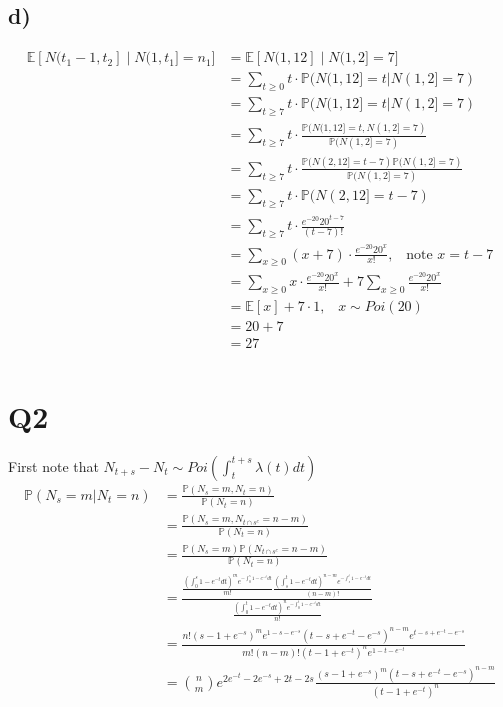 \documentclass{article}
\begin{document}
\subsection*{d)}
\begin{align*}
\mathbb{E}[N(t_1-1,t_2]\;|\;N(1,t_1]=n_1]&=\mathbb{E}[N(1,12]\;|\;N(1,2]=7]\\
&=\sum_{t\geq0}t\cdot\mathbb{P}(N(1,12]=t|N(1,2]=7)\\
&=\sum_{t\geq7}t\cdot\mathbb{P}(N(1,12]=t|N(1,2]=7)\\
&=\sum_{t\geq7}t\cdot\frac{\mathbb{P}(N(1,12]=t,N(1,2]=7)}{\mathbb{P}(N(1,2]=7)}\\
&=\sum_{t\geq7}t\cdot\frac{\mathbb{P}(N(2,12]=t-7)\mathbb{P}(N(1,2]=7)}{\mathbb{P}(N(1,2]=7)}\\
&=\sum_{t\geq7}t\cdot\mathbb{P}(N(2,12]=t-7)\\
&=\sum_{t\geq7}t\cdot\frac{e^{-20}20^{t-7}}{(t-7)!}\\
&=\sum_{x\geq0}(x+7)\cdot\frac{e^{-20}20^{x}}{x!},\;\;\;\text{note }x=t-7\\
&=\sum_{x\geq0}x\cdot\frac{e^{-20}20^{x}}{x!}+7\sum_{x\geq0}\frac{e^{-20}20^{x}}{x!}\\
&=\mathbb{E}[x]+7\cdot1,\;\;\;x\sim Poi(20)\\
&=20+7\\
&=27\\
\end{align*}
\section*{Q2}
First note that $N_{t+s}-N_{t}\sim Poi\left(\int_{t}^{t+s}\lambda(t)dt\right)$
\begin{align*}
\mathbb{P}(N_{s}=m|N_{t}=n)&=\frac{\mathbb{P}(N_{s}=m,N_{t}=n)}{\mathbb{P}(N_{t}=n)}\\
&=\frac{\mathbb{P}(N_{s}=m,N_{t\cap s^{c}}=n-m)}{\mathbb{P}(N_{t}=n)}\\
&=\frac{\mathbb{P}(N_{s}=m)\mathbb{P}(N_{t\cap s^{c}}=n-m)}{\mathbb{P}(N_{t}=n)}\\
&=\frac{\frac{\left(\int_{0}^{s}1-e^{-t}dt\right)^me^{-\int_{0}^{s}1-e^{-t}dt}}{m!}\frac{\left(\int_{s}^{t}1-e^{-t}dt\right)^{n-m}e^{-\int_{s}^{t}1-e^{-t}dt}}{(n-m)!}}{\frac{\left(\int_{0}^{t}1-e^{-t}dt\right)^ne^{-\int_{0}^{t}1-e^{-t}dt}}{n!}}\\
&=\frac{n!(s-1+e^{-s})^me^{1-s-e^{-s}}(t-s+e^{-t}-e^{-s})^{n-m}e^{t-s+e^{-t}-e^{-s}}}{m!(n-m)!(t-1+e^{-t})^ne^{1-t-e^{-t}}}\\
&={n\choose m}e^{2e^{-t}-2e^{-s}+2t-2s}\frac{(s-1+e^{-s})^m(t-s+e^{-t}-e^{-s})^{n-m}}{(t-1+e^{-t})^n}\\
\end{align*}
\end{document}
